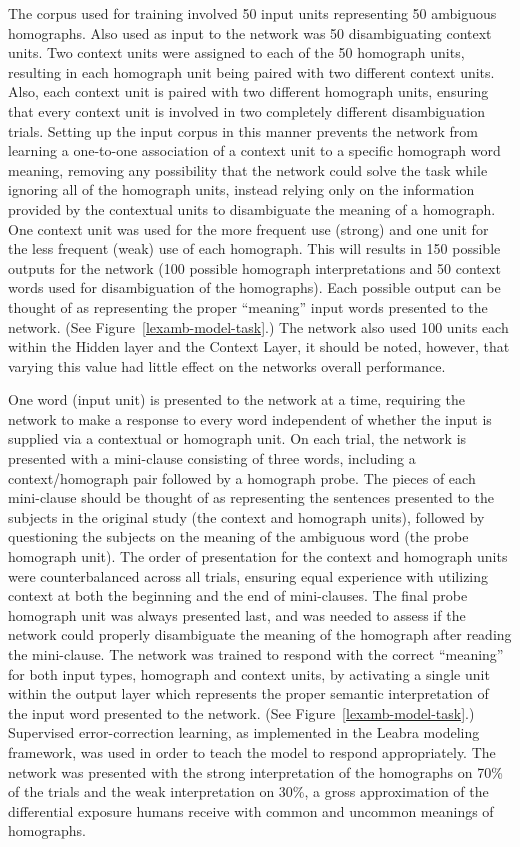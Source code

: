 The corpus used for training involved 50 input units representing 50 ambiguous homographs.  Also used as input to the network was 50 disambiguating context units.  Two context units were assigned to each of the 50 homograph units, resulting in each homograph unit being paired with two different context units. Also, each context unit is paired with two different homograph units, ensuring that every context unit is involved in two completely different disambiguation trials.  Setting up the input corpus in this manner prevents the network from learning a one-to-one association of a context unit to a specific homograph word meaning, removing any possibility that the network could solve the task while ignoring all of the homograph units, instead relying only on the information provided by the contextual units to disambiguate the meaning of a homograph.  One context unit was used for the more frequent use (strong) and one unit for the less frequent (weak) use of each homograph.  This will results in 150 possible outputs for the network (100 possible homograph interpretations and 50 context words used for disambiguation of the homographs).  Each possible output can be thought of as representing the proper ``meaning'' input words presented to the network.  (See Figure~\ref{lexamb-model-task}.)  The network also used 100 units each within the Hidden layer and the Context Layer, it should be noted, however, that varying this value had little effect on the networks overall performance.

One word (input unit) is presented to the network at a time, requiring the network to make a response to every word independent of whether the input is supplied via a contextual or homograph unit.  On each trial, the network is presented with a mini-clause consisting of three words, including a context/homograph pair followed by a homograph probe. The pieces of each mini-clause should be thought of as representing the sentences presented to the subjects in the original study (the context and homograph units), followed by questioning the subjects on the meaning of the ambiguous word (the probe homograph unit).  The order of presentation for the context and homograph units were counterbalanced across all trials, ensuring equal experience with utilizing context at both the beginning and the end of mini-clauses.  The final probe homograph unit was always presented last, and was needed to assess if the network could properly disambiguate the meaning of the homograph after reading the mini-clause.  The network was trained to respond with the correct ``meaning'' for both input types, homograph and context units, by activating a single unit within the output layer which represents the proper semantic interpretation of the input word presented to the network. (See Figure~\ref{lexamb-model-task}.) Supervised error-correction learning, as implemented in the Leabra modeling framework, was used in order to teach the model to respond appropriately.  The network was presented with the strong interpretation of the homographs on 70\% of the trials and the weak interpretation on 30\%, a gross approximation of the differential exposure humans receive with common and uncommon meanings of homographs.  

